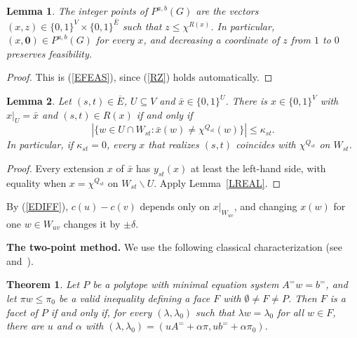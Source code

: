 \documentclass[a4paper,11pt]{article}
\newcommand{\Eb}{\overline{E}}
\newtheorem{thm}{Theorem}
\newtheorem{lem}{Lemma}
\theoremstyle{definition}
\begin{document}
\begin{lem} \label{LPOINTS}
The integer points of $P^{a,b}(G)$ are the vectors $(x,z) \in \{0,1\}^V \times \{0,1\}^{\Eb}$ such that $z \leq \chi^{R(x)}$. In particular,
$(x, \mathbf{0}) \in P^{a,b}(G)$ for every $x$, and decreasing a coordinate of $z$ from $1$ to $0$ preserves feasibility.
\end{lem}
\begin{proof}
This is (\ref{EFEAS}), since (\ref{RZ}) holds automatically.
\end{proof}

\begin{lem} \label{LEXT}
Let $(s,t) \in \Eb$, $U \subseteq V$ and $\bar{x} \in \{0,1\}^U$. There is $x \in \{0,1\}^V$ with $x|_U = \bar{x}$ and $(s,t) \in R(x)$
if and only if
$$|\{ w \in U \cap W_{st} : \bar{x}(w) \neq \chi^{Q_{st}}(w) \}| \leq \kappa_{st}.$$
In particular, if $\kappa_{st} = 0$, every $x$ that realizes $(s,t)$ coincides with $\chi^{Q_{st}}$ on $W_{st}$.
\end{lem}
\begin{proof}
Every extension $x$ of $\bar{x}$ has $y_{st}(x)$ at least the left-hand side, with equality when $x = \chi^{Q_{st}}$ on
$W_{st} \backslash U$. Apply Lemma~\ref{LREAL}.
\end{proof}

By (\ref{EDIFF}), $c(u) - c(v)$ depends only on $x|_{W_{uv}}$, and changing $x(w)$ for one $w \in W_{uv}$ changes it by $\pm\delta$.

\medskip

\noindent\textbf{The two-point method.} We use the following classical characterization (see~\cite{NW88} and~\cite{CMMZ02}).

\begin{thm} \label{TNW}
Let $P$ be a polytope with minimal equation system $A^= w = b^=$, and let $\pi w \leq \pi_0$ be a valid inequality defining a face $F$
with $\emptyset \neq F \neq P$. Then $F$ is a facet of $P$ if and only if, for every $(\lambda, \lambda_0)$ such that $\lambda w = \lambda_0$
for all $w \in F$, there are $u$ and $\alpha$ with $(\lambda, \lambda_0) = (uA^= + \alpha\pi, ub^= + \alpha\pi_0)$.
\end{thm}
\end{document}
